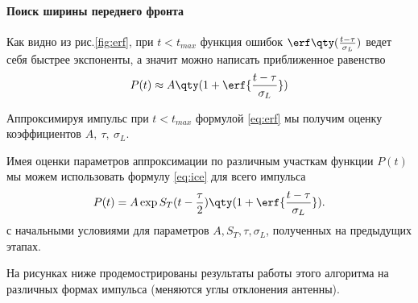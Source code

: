 \paragraph{Поиск ширины переднего фронта}%
Как видно из рис.\ref{fig:erf}, при $t<t_{max}$ функция ошибок
$\erf\qty(\frac{t - \tau}{\sigma_L})$ ведет себя
быстрее экспоненты, а значит можно написать приближенное равенство
\begin{equation}
    \label{eq:erf}
    P(t) \approx A \qty(1 + \erf{\frac{t - \tau}{\sigma_L}})
\end{equation}


Аппроксимируя импульс при $t<t_{max}$ формулой \eqref{eq:erf} мы получим оценку
коэффициентов $A,~\tau,~\sigma_L$. 

\label{par:etap_4_zakliuchitel_naia_approksimatsiia_}

 Имея оценки параметров аппроксимации по различным
участкам функции $P(t)$ мы можем использовать формулу  \eqref{eq:ice} для всего
импульса 
\begin{equation}
    \label{eq:ice}
    P(t) = A \exp{ S_T (t - \frac{\tau}{2})} \qty(1 + \erf{\frac{t-
    \tau}{\sigma_L}}).
\end{equation}
с начальными условиями для параметров $A, S_T, \tau, \sigma_L$, полученных на
предыдущих этапах. 


На рисунках ниже продемострированы результаты работы этого алгоритма на
различных формах импульса (меняются углы отклонения антенны).


